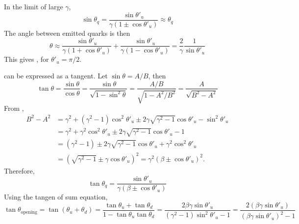 \documentclass[12pt]{article}
\begin{document}
In the limit of large $\gamma$,
\begin{equation}
  \sin\theta_q
  = \frac{\sin\theta'_u}{\gamma (1\pm\cos\theta'_u)}
  \approx \theta_q
\end{equation}
%
The angle between emitted quarks is then
\begin{equation}
  \theta \approx \frac{\sin\theta'_u}{\gamma (1 + \cos\theta'_u)}
               + \frac{\sin\theta'_u}{\gamma (1 - \cos\theta'_u)}
  = \frac{2}{\gamma}\frac{1}{\sin\theta'_u}
\end{equation}
This gives , for $\theta'_u=\pi/2$.

%

\vspace{5mm}
 can be expressed as a tangent. Let $\sin\theta = A/B$, then
\begin{equation}
  \tan\theta = \frac{\sin\theta}{\cos\theta}
  = \frac{\sin\theta}{\sqrt{1-\sin^2\theta}}
  = \frac{A/B}{\sqrt{1-A^2/B^2}}
  = \frac{A}{\sqrt{B^2-A^2}}
\end{equation}
%
From ,
\begin{align}
  B^2-A^2 &= \gamma^2 + (\gamma^2-1)\cos^2\theta'_u \pm 2\gamma\sqrt{\gamma^2-1}\cos\theta'_u - \sin^2\theta'_u
  \nonumber \\
  &= \gamma^2 + \gamma^2\cos^2\theta'_u \pm 2\gamma\sqrt{\gamma^2-1}\cos\theta'_u - 1
  \nonumber \\
  &= (\gamma^2-1) \pm 2\gamma\sqrt{\gamma^2-1}\cos\theta'_u + \gamma^2\cos^2\theta'_u
  \nonumber \\
  &= \left( \sqrt{\gamma^2-1} \pm \gamma\cos\theta'_u \right)^2
   = \gamma^2 \left( \beta \pm \cos\theta'_u \right)^2.
\end{align}
Therefore,
\begin{equation}\label{eq:tan}
  \boxed{
    \tan\theta_q
    = \frac{\sin\theta'_u}{\gamma\left( \beta \pm \cos\theta'_u \right)}
  }
\end{equation}
%
Using the tangen of sum equation,
\begin{equation}
  \tan\theta_\mathrm{opening} = \tan(\theta_u+\theta_d)
  = \frac{\tan\theta_u+\tan\theta_d}{1-\tan\theta_u\tan\theta_d}
  = \frac{2\beta\gamma\sin\theta'_u}{(\gamma^2-1)\sin^2\theta'_u - 1}
  = \frac{2(\beta\gamma\sin\theta'_u)}{(\beta\gamma\sin\theta'_u)^2 - 1}
\end{equation}
\end{document}
